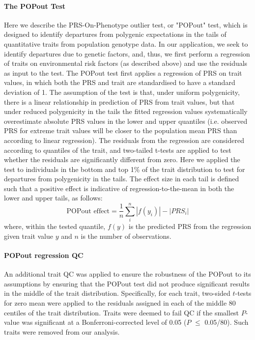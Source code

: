 \documentclass[12pt]{zHenriquesLab-StyleBioRxiv}
\begin{document}
{{\paragraph*{The POPout Test}
Here we describe the PRS-On-Phenotype outlier test, or "POPout" test, which is 
designed to identify departures from polygenic expectations in the tails of 
quantitative traits from population genotype data. In our application, we seek to identify 
departures due to genetic factors, and, thus, we first perform a regression of traits on 
environmental risk factors (as described above) and use the residuals as input to the test. 
The POPout test first applies a regression of PRS on trait values, in which both the 
PRS and trait are standardised to have a standard deviation of 1. The assumption of the 
test is that, under uniform polygenicity, there is a linear relationship in prediction 
of PRS from trait values, but that under reduced polygenicity in the tails the 
fitted regression values systematically overestimate absolute PRS values in the 
lower and upper quantiles (i.e. observed PRS for extreme trait values will be 
closer to the population mean PRS than according to linear regression). 
The residuals from the regression are considered according to quantiles of the trait, 
and two-tailed t-tests are applied to test whether the residuals are significantly different from zero. 
Here we applied the test to individuals in the bottom and top 1\% of the trait 
distribution to test for departures from polygenicity in the tails. The effect 
size in each tail is defined such that a positive effect is indicative of 
regression-to-the-mean in both the lower and upper tails, as follows:
\[
\text{POPout effect} = \frac{1}{n}\sum_i^n |{f(y_i)}| - |{PRS_i}|
\]
where, within the tested quantile, $f(y)$ is the predicted PRS from the regression given trait
value $y$ and $n$ is the number of observations.

\paragraph*{POPout regression QC}
An additional trait QC was applied to ensure the robustness of the
POPout to its assumptions by ensuring that the POPout test 
did not produce significant results in the middle of the trait distribution. 
Specifically, for each trait, two-sided $t$-tests for zero mean were
applied to the residuals assigned in each of the middle 80 centiles of
the trait distribution. Traits were deemed to fail QC if the smallest
$P$-value was significant at a Bonferroni-corrected level of 0.05 ($P$
$\le$ 0.05/80). Such traits were removed from our analysis.

}}
\end{document}
